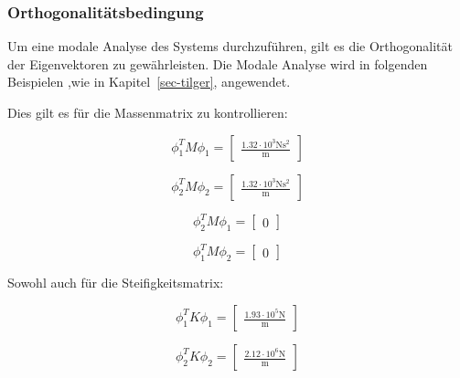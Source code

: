 \documentclass[
  letterpaper,
  DIV=11]{scrreprt}
\begin{document}
\hypertarget{sec-mms_nach_ortho}{%
\subsubsection{Orthogonalitätsbedingung}\label{sec-mms_nach_ortho}}

Um eine modale Analyse des Systems durchzuführen, gilt es die
Orthogonalität der Eigenvektoren zu gewährleisten. Die Modale Analyse
wird in folgenden Beispielen ,wie in Kapitel~\ref{sec-tilger},
angewendet.

Dies gilt es für die Massenmatrix zu kontrollieren:

\begin{equation}\phi_{1}^{T} M \phi_{1} = \left[\begin{matrix}\frac{1.32 \cdot 10^{3} \text{N} \text{s}^{2}}{\text{m}}\end{matrix}\right]\end{equation}

\begin{equation}\phi_{2}^{T} M \phi_{2} = \left[\begin{matrix}\frac{1.32 \cdot 10^{3} \text{N} \text{s}^{2}}{\text{m}}\end{matrix}\right]\end{equation}

\begin{equation}\phi_{2}^{T} M \phi_{1} = \left[\begin{matrix}0\end{matrix}\right]\end{equation}

\begin{equation}\phi_{1}^{T} M \phi_{2} = \left[\begin{matrix}0\end{matrix}\right]\end{equation}

Sowohl auch für die Steifigkeitsmatrix:

\begin{equation}\phi_{1}^{T} K \phi_{1} = \left[\begin{matrix}\frac{1.93 \cdot 10^{5} \text{N}}{\text{m}}\end{matrix}\right]\end{equation}

\begin{equation}\phi_{2}^{T} K \phi_{2} = \left[\begin{matrix}\frac{2.12 \cdot 10^{6} \text{N}}{\text{m}}\end{matrix}\right]\end{equation}
\end{document}

